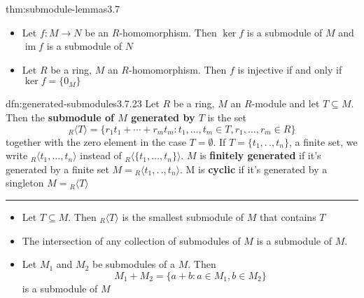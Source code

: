 \documentclass[landscape, 8pt]{extarticle}
\DeclareMathOperator{\im}{im}
\begin{document}
\begin{multicols}{3}
\vspace{-5pt}
\begin{thm}{thm:submodule-lemmas}{3.7}
    \vspace{-5pt}
    \begin{itemize}
        \setlength\itemsep{0em}
        \item[\textbf{3.7.21}] Let $f : M\to N$ be an $R$-homomorphism. Then $\ker f$ is a submodule of $M$ and $\im f$ is a submodule of $N$
        \item[\textbf{2.7.22}] Let $R$ be a ring, $M$ an $R$-homomorphism. Then $f$ is injective if and only if $\ker f = \{0_{M}\}$
    \end{itemize}
\end{thm}

\vspace{-5pt}
\begin{dfn}{dfn:generated-submodules}{3.7.23}
    Let $R$ be a ring, $M$ an $R$-module and let $T \subseteq M$. Then the \textbf{submodule of $M$ generated by $T$} is the set
    \[{}_{R}\langle T \rangle = \{r_{1}t_{1} +\cdots+ r_{m}t_{m} : t_{1},\dots,t_{m}\in T, r_{1},\dots,r_{m}\in R\}\]
    together with the zero element in the case $T = \emptyset$. If $T = \{t_{1},.\,.,t_{n}\}$, a finite set, we write ${}_{R}\langle t_{1},\dots,t_{n} \rangle$ instead of ${}_{R}\langle \{t_{1},\dots,t_{n}\} \rangle$. $M$ is \textbf{finitely generated} if it's generated by a finite set $M = {}_{R}\langle t_{1},.\,.,t_{n} \rangle$. M is \textbf{cyclic} if it's generated by a singleton $M = {}_{R}\langle T\rangle$

    \vspace{-5pt}
    \noindent\rule{\textwidth}{0.2pt}
    \vspace{-13pt}

    \begin{itemize}
        \setlength\itemsep{0em}
        \item[\textbf{3.7.28}] Let $T \subseteq M$. Then ${}_{R}\langle T \rangle$ is the smallest submodule of $M$ that contains $T$
        \item[\textbf{3.7.29}] The intersection of any collection of submodules of $M$ is a submodule of $M$.
        \item[\textbf{3.7.30}] Let $M_{1}$ and $M_{2}$ be submodules of a $M$. Then
            \[M_{1} + M_{2} = \{a + b : a\in M_{1}, b\in M_{2}\}\]
            is a submodule of $M$
    \end{itemize}
\end{dfn}


\end{multicols}
\end{document}
